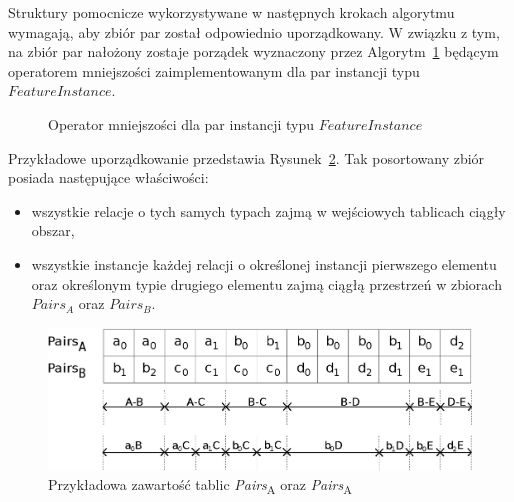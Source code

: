 \documentclass[12pt]{article}
\begin{document}
Struktury pomocnicze wykorzystywane w następnych krokach algorytmu wymagają, aby zbiór par został odpowiednio uporządkowany. W związku z tym, na zbiór par nałożony zostaje porządek wyznaczony przez Algorytm~\ref{alg:FeatureInstancePair-operator} będącym operatorem mniejszości zaimplementowanym dla par instancji typu $ FeatureInstance $.

\begin{figure}[H]
\begin{algorithm}[H]
\caption{Operator mniejszości dla par instancji typu $ FeatureInstance $}
\label{alg:FeatureInstancePair-operator}
\end{algorithm}
\end{figure}

Przykładowe uporządkowanie przedstawia Rysunek~\ref{fig:pairs_content}. Tak posortowany zbiór posiada następujące właściwości:
\begin{itemize}
\item wszystkie relacje o tych samych typach zajmą w wejściowych tablicach ciągły obszar,
\item wszystkie instancje każdej relacji o określonej instancji pierwszego elementu oraz określonym typie drugiego elementu zajmą ciągłą przestrzeń w zbiorach $ Pairs_{A} $ oraz $ Pairs_{B} $.
\end{itemize}

\begin{figure}[H]
\centering
\includegraphics[width=\textwidth]{order_prop1.eps}
\caption{Przykładowa zawartość tablic \textit{Pairs}\textsubscript{A} oraz \textit{Pairs}\textsubscript{A}}
\label{fig:pairs_content}
\end{figure}
\end{document}
